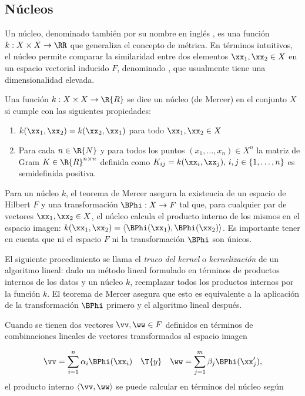 %
%
\subsection{Núcleos}

Un núcleo, denominado también por su nombre en inglés , es
una función $k:X\times{}X\rightarrow{}\RR$ \cite{stewart} que
generaliza el concepto de métrica. En términos intuitivos, el núcleo
permite comparar la similaridad entre dos elementos
$\xx_1,\xx_2\in{}X$ en un espacio vectorial inducido $F$, denominado
, que usualmente tiene una dimensionalidad elevada.

\begin{definicion}
[Núcleo]
  Una función $k:X\times{}X\rightarrow{}\R{R}$ se dice un núcleo (de
  Mercer) en el conjunto $X$ si cumple con las siguientes propiedades:
  \begin{enumerate}
  \item $k(\xx_1,\xx_2)=k(\xx_2,\xx_1)$ para todo $\xx_1,\xx_2\in{}X$
  \item Para cada $n\in\R{N}$ y para todos los puntos
    $(x_1,\ldots,x_n)\in{}X^n$ la matriz de Gram
    $K\in\R{R}^{n\times{}n}$ definida como
    $K_{ij}=k(\xx_i,\xx_j),\,i,j\in\{1,\ldots,n\}$ es semidefinida
    positiva.
  \end{enumerate}
\end{definicion}
Para un núcleo $k$, el teorema de Mercer \cite{mercer} asegura la
existencia de un espacio de Hilbert $F$ y una transformación
$\BPhi:X\rightarrow{}F$ tal que, para cualquier par de vectores
$\xx_1,\xx_2\in{}X$, el núcleo calcula el producto interno de los
mismos en el espacio imagen:
$k(\xx_1,\xx_2)=\langle\BPhi(\xx_1),\BPhi(\xx_2)\rangle$. Es
importante tener en cuenta que ni el espacio $F$ ni la transformación
$\BPhi$ son únicos.

El siguiente procedimiento se llama el \emph{truco del kernel} o
\emph{kernelización} de un algoritmo lineal: dado un método lineal
formulado en términos de productos internos de los datos y un núcleo
$k$, reemplazar todos los productos internos por la función $k$.  El
teorema de Mercer asegura que esto es equivalente a la aplicación de
la transformación $\BPhi$ primero y el algoritmo
lineal después.

Cuando se tienen dos vectores $\vv,\ww\in{}F$ definidos en términos
de combinaciones lineales de vectores transformados al espacio imagen

\begin{align*}
  \vv=\sum_{i=1}^{n}\alpha_i\BPhi(\xx_i) \quad\T{ y }\quad
  \ww=\sum_{j=1}^{m}\beta_j\BPhi(\xx_j'),
\end{align*}
el producto interno $\langle\vv,\ww\rangle$ se puede calcular en
términos del núcleo según

